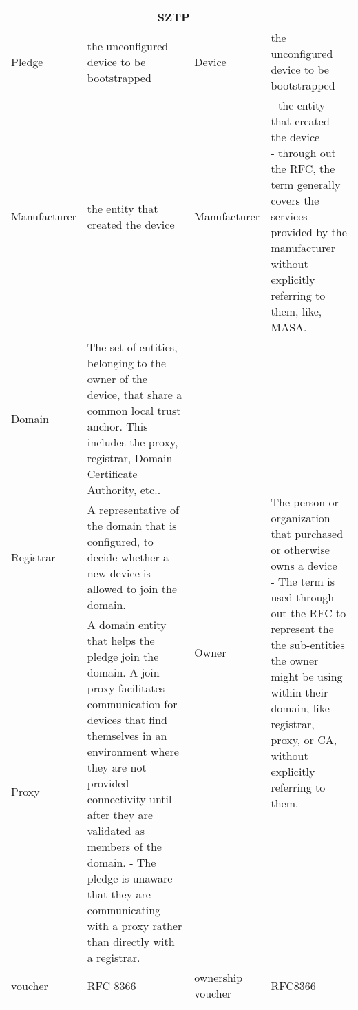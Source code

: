 \centering
  \begin{longtable}{|p{2cm}|p{4cm}|p{2cm}|p{4cm}|}
    \hline
    \rowcolor[rgb]{ .745,  .804,  .843} \multicolumn{2}{|c|}{\cellcolor[rgb]{ .745,  .804,  .843}BRSKI} & \multicolumn{2}{c|}{SZTP} \\
    \hline
    \endhead
    Pledge & the unconfigured device to be bootstrapped & \multicolumn{1}{l|}{Device} & \multicolumn{1}{p{4cm}|}{the unconfigured device to be bootstrapped} \\
    \hline
    \multicolumn{1}{|l|}{Manufacturer} & the entity that created the device & \multicolumn{1}{l|}{Manufacturer} & \multicolumn{1}{p{4cm}|}{ - the entity that created the device\newline{} - through out the RFC, the term generally covers the services provided by the manufacturer without explicitly referring to them, like, MASA.} \\
    \hline
    Domain & The set of entities, belonging to the owner of the device, that share a common local trust anchor. This includes the proxy, registrar, Domain Certificate Authority, etc.. & \multicolumn{1}{l|}{\multirow{3}{*}{Owner}} & \multicolumn{1}{p{4cm}|}{\multirow{3}{=}{The person or organization that purchased or otherwise owns a device\newline{} - The term is used through out the RFC to represent the the sub-entities the owner might be using within their domain, like registrar, proxy, or CA, without explicitly referring to them.}} \\
\cline{1-2}    Registrar & A representative of the domain that is configured, to decide whether a new device is allowed to join the domain. &       &  \\
\cline{1-2}    Proxy & A domain entity that helps the pledge join the domain. A join proxy facilitates communication for devices that find themselves in an environment where they are not provided connectivity until after they are validated as members of the domain.\newline{} -  The pledge is unaware that they are communicating with a proxy rather than directly with a registrar. &       &  \\
    \hline
    voucher & RFC 8366 & ownership voucher & RFC8366 \\
    \hline
    \end{longtable}